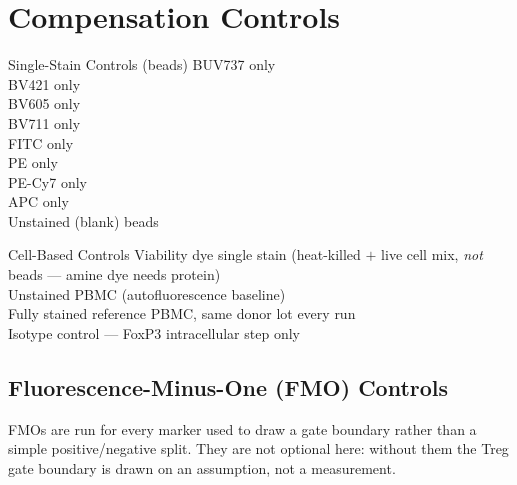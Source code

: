 \section{Compensation Controls}
\label{sec:comp-controls}

\begin{minipage}[t]{0.48\textwidth}
\begin{checklistbox}{Single-Stain Controls (beads)}
\ctrlbox BUV737 only \\
\ctrlbox BV421 only \\
\ctrlbox BV605 only \\
\ctrlbox BV711 only \\
\ctrlbox FITC only \\
\ctrlbox PE only \\
\ctrlbox PE-Cy7 only \\
\ctrlbox APC only \\
\ctrlbox Unstained (blank) beads
\end{checklistbox}
\end{minipage}%
\hfill
\begin{minipage}[t]{0.48\textwidth}
\begin{checklistbox}{Cell-Based Controls}
\ctrlbox Viability dye single stain (heat-killed \(+\) live cell mix, \emph{not} beads --- amine dye needs protein) \\
\ctrlbox Unstained PBMC (autofluorescence baseline) \\
\ctrlbox Fully stained reference PBMC, same donor lot every run \\
\ctrlbox Isotype control --- FoxP3 intracellular step only
\end{checklistbox}
\end{minipage}
\par
\vspace{8pt}

\subsection{Fluorescence-Minus-One (FMO) Controls}
FMOs are run for every marker used to draw a gate boundary rather than a
simple positive/negative split. They are not optional here: without them the
Treg gate boundary is drawn on an assumption, not a measurement.

